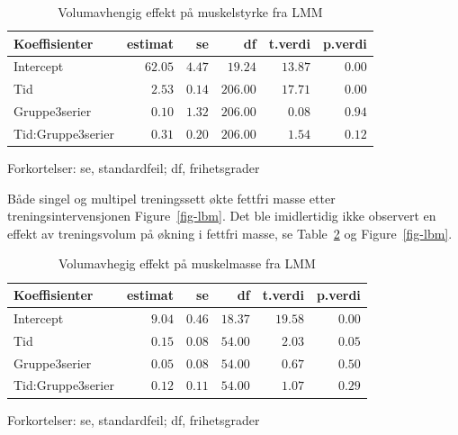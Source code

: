 \documentclass[
  letterpaper,
  DIV=11,
  numbers=noendperiod]{scrartcl}
\begin{document}
\hypertarget{tbl-str}{}
\setlength{\LTpost}{0mm}
\begin{longtable}{lrrrrr}
\caption{\label{tbl-str}Volumavhengig effekt på muskelstyrke fra LMM }\tabularnewline

\toprule
Koeffisienter & estimat & se & df & t.verdi & p.verdi \\ 
\midrule
Intercept & $62.05$ & $4.47$ & $19.24$ & $13.87$ & $0.00$ \\ 
Tid & $2.53$ & $0.14$ & $206.00$ & $17.71$ & $0.00$ \\ 
Gruppe3serier & $0.10$ & $1.32$ & $206.00$ & $0.08$ & $0.94$ \\ 
Tid:Gruppe3serier & $0.31$ & $0.20$ & $206.00$ & $1.54$ & $0.12$ \\ 
\bottomrule
\end{longtable}
\begin{minipage}{\linewidth}
Forkortelser: se, standardfeil; df, frihetsgrader\\
\end{minipage}

Både singel og multipel treningssett økte fettfri masse etter
treningsintervensjonen Figure~\ref{fig-lbm}. Det ble imidlertidig ikke
observert en effekt av treningsvolum på økning i fettfri masse, se
Table~\ref{tbl-lbm} og Figure~\ref{fig-lbm}.

\hypertarget{tbl-lbm}{}
\setlength{\LTpost}{0mm}
\begin{longtable}{lrrrrr}
\caption{\label{tbl-lbm}Volumavhegig effekt på muskelmasse fra LMM }\tabularnewline

\toprule
Koeffisienter & estimat & se & df & t.verdi & p.verdi \\ 
\midrule
Intercept & $9.04$ & $0.46$ & $18.37$ & $19.58$ & $0.00$ \\ 
Tid & $0.15$ & $0.08$ & $54.00$ & $2.03$ & $0.05$ \\ 
Gruppe3serier & $0.05$ & $0.08$ & $54.00$ & $0.67$ & $0.50$ \\ 
Tid:Gruppe3serier & $0.12$ & $0.11$ & $54.00$ & $1.07$ & $0.29$ \\ 
\bottomrule
\end{longtable}
\begin{minipage}{\linewidth}
Forkortelser: se, standardfeil; df, frihetsgrader\\
\end{minipage}
\end{document}
